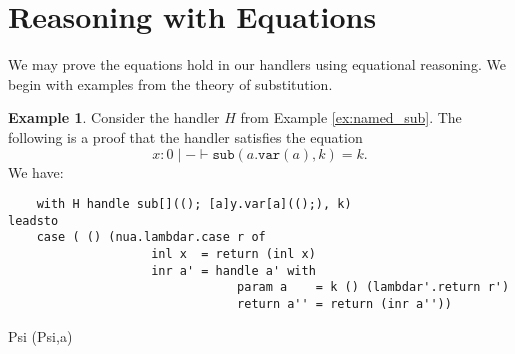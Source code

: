 \documentclass{scrartcl}
\theoremstyle{definition}
\newtheorem{example}[theorem]{Example}
\newcommand{\sub}{\mathtt{sub}}
\newcommand{\var}{\mathtt{var}}
\begin{document}
\section{Reasoning with Equations}

We may prove the equations hold in our handlers using equational reasoning. We begin with examples from the theory of substitution.

\begin{example}
Consider the handler $H$ from Example \ref{ex:named_sub}. The following is a proof that the handler satisfies the equation
\[x: 0 \mid - \vdash \sub(a.\var(a), k) = k.\]
We have:
\begin{lstlisting}
    with H handle sub[]((); [a]y.var[a](();), k)
leadsto
    case ( () (nua.lambdar.case r of
                    inl x  = return (inl x)
                    inr a' = handle a' with
                                param a    = k () (lambdar'.return r')
                                return a'' = return (inr a''))

\end{lstlisting}

Psi (Psi,a)

\end{example}

\printbibliography
\end{document}
